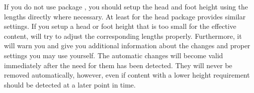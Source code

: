 If you do not use package , you should setup the head and
foot height using the lengths directly where necessary. At least for the head
package  provides similar settings. If you setup a head or
foot height that is too small for the effective content,
 will try to adjust the corresponding lengths
properly. Furthermore, it will warn you and give you additional information
about the changes and proper settings you may use yourself. The automatic
changes will become valid immediately after the need for them has been
detected.  They will never be removed automatically, however, even if content
with a lower height requirement should be detected at a later point in time.%
\EndIndexGroup
%
\EndIndexGroup

